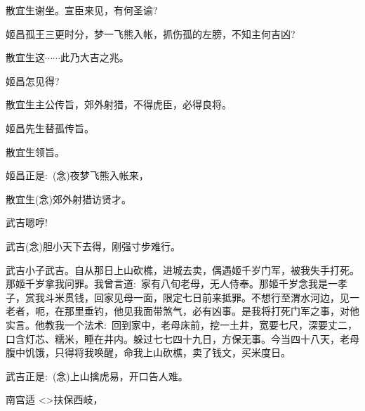 {散宜生\hspace{20pt}谢坐。宣臣来见，有何圣谕?

姬昌\hspace{30pt}孤王三更时分，梦一飞熊入帐，抓伤孤的左膀，不知主何吉凶?

散宜生\hspace{20pt}这$\cdots{}\cdots{}$此乃大吉之兆。

姬昌\hspace{30pt}怎见得?

散宜生\hspace{20pt}主公传旨，郊外射猎，不得虎臣，必得良将。

姬昌\hspace{30pt}先生替孤传旨。

散宜生\hspace{20pt}领旨。

姬昌\hspace{30pt}正是:~({\akai 念})夜梦飞熊入帐来，

	散宜生\hspace{20pt}({\akai 念})郊外射猎访贤才。

\vspace{5pt}

武吉\hspace{30pt}嗯哼!

武吉\hspace{30pt}({\akai 念})胆小天下去得，刚强寸步难行。

\setlength{\hangindent}{52pt}   %
{武吉\hspace{30pt}小子武吉。自从那日上山砍樵，进城去卖，偶遇姬千岁门军，被我失手打死。那姬千岁拿我问罪。我曾言道:~家有八旬老母，无人侍奉。那姬千岁念我是一孝子，赏我斗米贯钱，回家见母一面，限定七日前来抵罪。不想行至渭水河边，见一老者，呃，在那里垂钓，他见我面带煞气，必有凶事。是我将打死门军之事，对他实言。他教我一个法术:~回到家中，老母床前，挖一土井，宽要七尺，深要丈二，口含灯芯、糯米，睡在井内。躲过七七四十九日，方保无事。今当四十八天，老母腹中饥饿，只得将我唤醒，命我上山砍樵，卖了钱文，买米度日。}

武吉\hspace{30pt}正是:~({\akai 念})上山擒虎易，开口告人难。

\vspace{5pt}

南宫适\hspace{20pt} \textless{}\!\textgreater{}扶保西岐，

}
